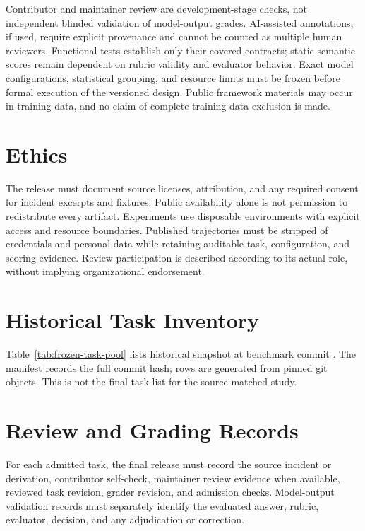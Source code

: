 \documentclass[11pt]{article}
\begin{document}
Contributor and maintainer review are development-stage checks, not independent blinded validation of model-output grades.
AI-assisted annotations, if used, require explicit provenance and cannot be counted as multiple human reviewers.
Functional tests establish only their covered contracts; static semantic scores remain dependent on rubric validity and evaluator behavior.
Exact model configurations, statistical grouping, and resource limits must be frozen before formal execution of the versioned design.
Public framework materials may occur in training data, and no claim of complete training-data exclusion is made.

\section*{Ethics}

The release must document source licenses, attribution, and any required consent for incident excerpts and fixtures.
Public availability alone is not permission to redistribute every artifact.
Experiments use disposable environments with explicit access and resource boundaries.
Published trajectories must be stripped of credentials and personal data while retaining auditable task, configuration, and scoring evidence.
Review participation is described according to its actual role, without implying organizational endorsement.


\appendix

\section{Historical Task Inventory}
\label{app:tasklist}
Table~\ref{tab:frozen-task-pool} lists historical snapshot \texttt{\BenchmarkSnapshotId{}} at benchmark commit \texttt{\BenchmarkCommitShort{}}.
The manifest records the full commit hash; rows are generated from pinned git objects.
This is not the final task list for the source-matched study.
\begingroup
\def\small{\fontsize{8}{9.5}\selectfont}
\setlength{\tabcolsep}{1pt}

\endgroup

\section{Review and Grading Records}
\label{app:rubrics}
For each admitted task, the final release must record the source incident or derivation, contributor self-check, maintainer review evidence when available, reviewed task revision, grader revision, and admission checks.
Model-output validation records must separately identify the evaluated answer, rubric, evaluator, decision, and any adjudication or correction.
\end{document}
